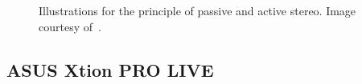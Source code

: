 \begin{figure}[!htbp]
\centering
{}
\caption{Illustrations for the principle of passive and active stereo. Image courtesy of~\cite{horaud2013tutorial}.}
\label{fig:rgbd_camera}
\end{figure}


\subsection{ASUS Xtion PRO LIVE}

